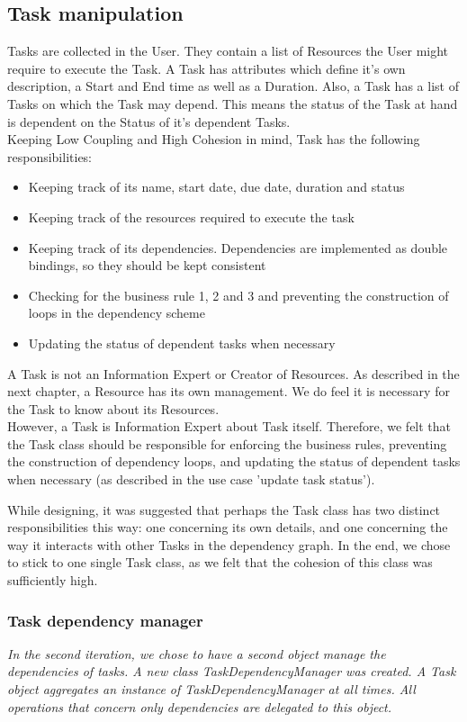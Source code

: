 			\subsection{Task manipulation}
			Tasks are collected in the User. They contain a list of Resources the User might require to execute the Task.
			A Task has attributes which define it's own description, a Start and End time as well as a Duration.
			Also, a Task has a list of Tasks on which the Task may depend. This means the status of the Task at hand is dependent on the Status of it's dependent Tasks.\\
			Keeping Low Coupling and High Cohesion in mind, Task has the following responsibilities:
			\begin{itemize}
				\item{Keeping track of its name, start date, due date, duration and status}
				\item{Keeping track of the resources required to execute the task}
				\item{Keeping track of its dependencies. Dependencies are implemented as double bindings, so they should be kept consistent}
				\item{Checking for the business rule 1, 2 and 3 and preventing the construction of loops in the dependency scheme}
				\item{Updating the status of dependent tasks when necessary}
			\end{itemize}
			A Task is not an Information Expert or Creator of Resources. As described in the next chapter, a Resource has its own management.
			We do feel it is necessary for the Task to know about its Resources.\\
			However, a Task is Information Expert about Task itself. Therefore, we felt that the Task class should be responsible for enforcing the business rules, preventing the construction of dependency loops, and updating the status of dependent tasks when necessary (as described in the use case 'update task status').
			
			While designing, it was suggested that perhaps the Task class has two distinct responsibilities this way: one concerning its own details, and one concerning the way it interacts with other Tasks in the dependency graph. In the end, we chose to stick to one single Task class, as we felt that the cohesion of this class was sufficiently high.
			
			\subsubsection{Task dependency manager}
				\emph{
			In the second iteration, we chose to have a second object manage the dependencies of tasks. A new class TaskDependencyManager was created. A Task object aggregates an instance of TaskDependencyManager at all times. All operations that concern only dependencies are delegated to this object.}
			
